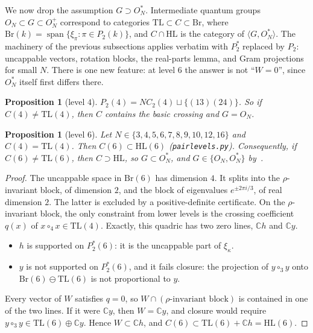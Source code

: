 \documentclass[11pt]{amsart}
\newtheorem{proposition}[theorem]{Proposition}
\theoremstyle{definition}
\theoremstyle{remark}
\theoremstyle{plain}
\numberwithin{equation}{section}
\numberwithin{table}{section}
\newcommand{\C}{\mathbb C}
\newcommand{\TL}{\mathrm{TL}}
\newcommand{\HL}{\mathrm{HL}}
\DeclareMathOperator{\spn}{span}
\begin{document}
We now drop the assumption $G\supset O_N^*$. Intermediate quantum groups $O_N\subset G\subset O_N^+$ correspond to
categories $\TL\subset C\subset\mathrm{Br}$, where $\mathrm{Br}(k)=\spn\{\xi_\pi:\pi\in P_2(k)\}$, and $C\cap\HL$ is the
category of $\langle G,O_N^*\rangle$. The machinery of the previous subsections applies verbatim with $P_2^*$ replaced by $P_2$:
uncappable vectors, rotation blocks, the real-parts lemma, and Gram projections for small $N$. There is one new feature:
at level $6$ the answer is not ``$W=0$'', since $O_N^*$ itself first differs there.

\begin{proposition}[level $4$]\label{prop:brfour}
$P_2(4)=NC_2(4)\sqcup\{(13)(24)\}$. So if $C(4)\ne\TL(4)$, then $C$ contains the basic crossing and $G=O_N$.
\end{proposition}

\begin{proposition}[level $6$]\label{prop:brsix}
Let $N\in\{3,4,5,6,7,8,9,10,12,16\}$ and $C(4)=\TL(4)$. Then $C(6)\subset\HL(6)$ (\texttt{pairlevels.py}). Consequently, if $C(6)\ne\TL(6)$, then $C\supset\HL$, so
$G\subset O_N^*$, and $G\in\{O_N,O_N^*\}$ by~\cite{bbcc}.
\end{proposition}

\begin{proof}
The uncappable space in $\mathrm{Br}(6)$ has dimension $4$. It splits into the $\rho$-invariant block, of dimension $2$, and
the block of eigenvalues $e^{\pm2\pi i/3}$, of real dimension $2$. The latter is excluded by a positive-definite certificate.
On the $\rho$-invariant block, the only constraint from lower levels is the crossing coefficient $q(x)$ of
$x\circ_4x\in\TL(4)$. Exactly, this quadric has two zero lines, $\C h$ and $\C y$.
\begin{itemize}
\item $h$ is supported on $P_2^*(6)$: it is the uncappable part of $\xi_\kappa$.
\item $y$ is not supported on $P_2^*(6)$, and it fails closure: the projection of $y\circ_3y$ onto $\mathrm{Br}(6)\ominus\TL(6)$
is not proportional to $y$.
\end{itemize}
Every vector of $W$ satisfies $q=0$, so $W\cap(\rho\text{-invariant block})$ is contained in one of the two lines. If it were
$\C y$, then $W=\C y$, and closure would require $y\circ_3y\in\TL(6)\oplus\C y$. Hence $W\subset\C h$, and $C(6)\subset\TL(6)+\C h=\HL(6)$.
\end{proof}
\end{document}
